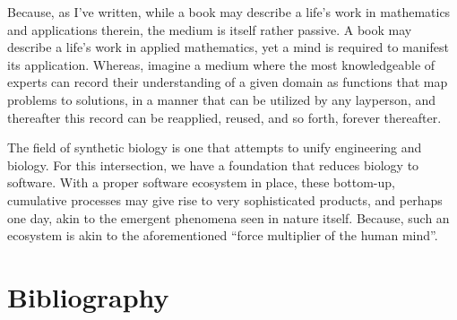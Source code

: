 Because, as I've written, while a book may describe a life’s work in mathematics and applications therein, the medium is itself rather passive. A book may describe a life’s work in applied mathematics, yet a mind is required to manifest its application. Whereas, imagine a medium where the most knowledgeable of experts can record their understanding of a given domain as functions that map problems to solutions, in a manner that can be utilized by any layperson, and thereafter this record can be reapplied, reused, and so forth, forever thereafter.

The field of synthetic biology is one that attempts to unify engineering and biology. For this intersection, we have a foundation that reduces biology to software. With a proper software ecosystem in place, these bottom-up, cumulative processes may give rise to very sophisticated products, and perhaps one day, akin to the emergent phenomena seen in nature itself. Because, such an ecosystem is akin to the aforementioned ``force multiplier of the human mind''.





\section*{Bibliography}

